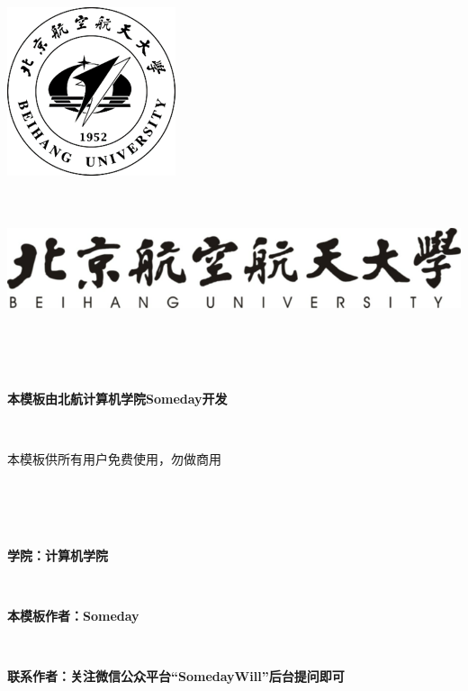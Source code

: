 \documentclass{ctexart}
\newcommand{\erhao}{\fontsize{21pt}{0}}
\newcommand{\sihao}{\fontsize{14pt}{0}}
\begin{document}
\lhead{}%
\rhead{}%


\setcounter{secnumdepth}{0}%





\includegraphics[scale=1]{include_picture/xiaohui.png}
\ \\ 
\ \\
\ \\
\begin{center}
\includegraphics[scale=1]{include_picture/xiaoming.png}
\end{center}
\ \\
\ \\
\ \\
\erhao
\centerline{\erhao\textbf{本模板由北航计算机学院Someday开发}} %
\ \\
\centerline{本模板供所有用户免费使用，勿做商用}
\ \\
\ \\
\ \\
\sihao
\centerline{\textbf{学院：计算机学院}}
\ \\
\centerline{\textbf{本模板作者：Someday}}
\ \\
\centerline{\textbf{联系作者：关注微信公众平台“SomedayWill”后台提问即可}}
\end{document}
